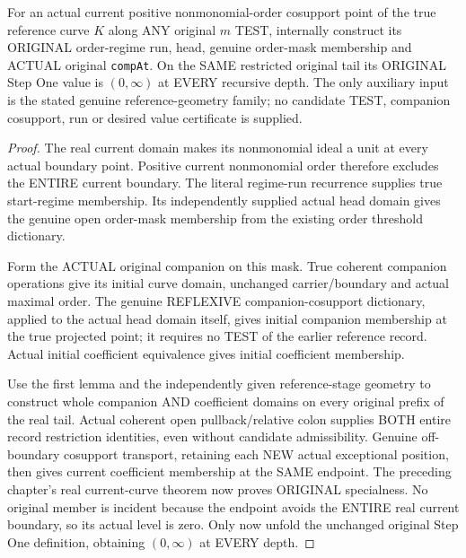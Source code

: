 \begin{theorem}
\label{hir:original-modeled-curve-actual-run-companion-special}
\leanok
For an actual current positive nonmonomial-order cosupport point of the true
reference curve $K$ along ANY original $m$ TEST, internally construct its ORIGINAL
order-regime run, head, genuine order-mask membership and ACTUAL original
\texttt{compAt}. On the SAME restricted original tail its ORIGINAL Step One
value is $(0,\infty)$ at EVERY recursive depth. The only auxiliary input is the
stated genuine reference-geometry family; no candidate TEST, companion cosupport,
run or desired value certificate is supplied.
\end{theorem}
\begin{proof}
The real current domain makes its nonmonomial ideal a unit at every actual
boundary point. Positive current nonmonomial order therefore excludes the ENTIRE
current boundary. The literal regime-run recurrence supplies true start-regime
membership. Its independently supplied actual head domain gives the genuine
open order-mask membership from the existing order threshold dictionary.

Form the ACTUAL original companion on this mask. True coherent companion
operations give its initial curve domain, unchanged carrier/boundary and actual
maximal order. The genuine REFLEXIVE companion-cosupport dictionary, applied to
the actual head domain itself, gives initial companion membership at the true
projected point; it requires no TEST of the earlier reference record. Actual
initial coefficient equivalence gives initial coefficient membership.

Use the first lemma and the independently given reference-stage geometry to
construct whole companion AND coefficient domains on every original prefix of
the real tail. Actual coherent open pullback/relative colon supplies BOTH entire
record restriction identities, even without candidate admissibility. Genuine
off-boundary cosupport transport, retaining each NEW actual exceptional position,
then gives current coefficient membership at the SAME endpoint. The preceding
chapter's real current-curve theorem now proves ORIGINAL specialness. No original
member is incident because the endpoint avoids the ENTIRE real current boundary,
so its actual level is zero. Only now unfold the unchanged original Step One
definition, obtaining $(0,\infty)$ at EVERY depth.
\end{proof}


